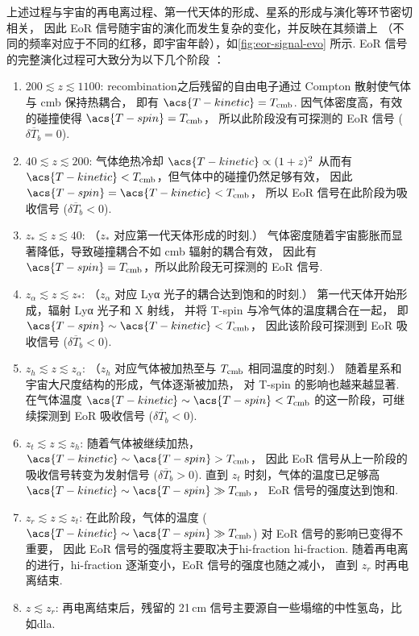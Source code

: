 上述过程与宇宙的再电离过程、第一代天体的形成、星系的形成与演化等环节密切相关，
因此 EoR 信号随宇宙的演化而发生复杂的变化，并反映在其频谱上
（不同的频率对应于不同的红移，即宇宙年龄），如\autoref{fig:eor-signal-evo} 所示.
EoR 信号的完整演化过程可大致分为以下几个阶段 \cite{pritchard2012}：
\begin{enumerate}
  \item $200 \lesssim z \lesssim 1100$:
    \ac{recombination}之后残留的自由电子通过 Compton 散射使气体与 \ac{cmb} 保持热耦合，
    即有 $\acs{T-kinetic} = T_{\R{cmb}}$.
    因气体密度高，有效的碰撞使得 $\acs{T-spin} = T_{\R{cmb}}$，
    所以此阶段没有可探测的 EoR 信号 ($\delta\overline{T}_b = 0$).

  \item $40 \lesssim z \lesssim 200$:
    气体绝热冷却 $\acs{T-kinetic} \propto (1+z)^2$
    从而有 $\acs{T-kinetic} < T_{\R{cmb}}$，但气体中的碰撞仍然足够有效，
    因此 $\acs{T-spin} = \acs{T-kinetic} < T_{\R{cmb}}$，
    所以 EoR 信号在此阶段为吸收信号 ($\delta\overline{T}_b < 0$).

  \item $z_* \lesssim z \lesssim 40$:
    （$z_*$ 对应第一代天体形成的时刻.）
    气体密度随着宇宙膨胀而显著降低，导致碰撞耦合不如 \ac{cmb} 辐射的耦合有效，
    因此有 $\acs{T-spin} = T_{\R{cmb}}$，所以此阶段无可探测的 EoR 信号.

  \item $z_{\alpha} \lesssim z \lesssim z_*$:
    （$z_{\alpha}$ 对应 Lyα 光子的耦合达到饱和的时刻.）
    第一代天体开始形成，辐射 Lyα 光子和 X 射线，
    并将 \acs{T-spin} 与冷气体的温度耦合在一起，
    即 $\acs{T-spin} \sim \acs{T-kinetic} < T_{\R{cmb}}$，
    因此该阶段可探测到 EoR 吸收信号 ($\delta\overline{T}_b < 0$).

  \item $z_h \lesssim z \lesssim z_{\alpha}$:
    （$z_h$ 对应气体被加热至与 $T_{\mathrm{cmb}}$ 相同温度的时刻.）
    随着星系和宇宙大尺度结构的形成，气体逐渐被加热，
    对 \acs{T-spin} 的影响也越来越显著.
    在气体温度 $\acs{T-kinetic} \sim \acs{T-spin} < T_{\R{cmb}}$
    的这一阶段，可继续探测到 EoR 吸收信号 ($\delta\overline{T}_b < 0$).

  \item $z_t \lesssim z \lesssim z_h$:
    随着气体被继续加热，$\acs{T-kinetic} \sim \acs{T-spin} > T_{\R{cmb}}$，
    因此 EoR 信号从上一阶段的吸收信号转变为发射信号 ($\delta\overline{T}_b > 0$).
    直到 $z_t$ 时刻，气体的温度已足够高
    $\acs{T-kinetic} \sim \acs{T-spin} \gg T_{\R{cmb}}$，
    EoR 信号的强度达到饱和.

  \item $z_r \lesssim z \lesssim z_t$:
    在此阶段，气体的温度 ($\acs{T-kinetic} \sim \acs{T-spin} \gg T_{\R{cmb}}$)
    对 EoR 信号的影响已变得不重要，
    因此 EoR 信号的强度将主要取决于\acl{hi-fraction} \acs{hi-fraction}.
    随着再电离的进行，\acs{hi-fraction} 逐渐变小，EoR 信号的强度也随之减小，
    直到 $z_r$ 时再电离结束.

  \item $z \lesssim z_r$:
    再电离结束后，残留的 21\,cm 信号主要源自一些塌缩的中性氢岛，比如\ac{dla}.
\end{enumerate}


